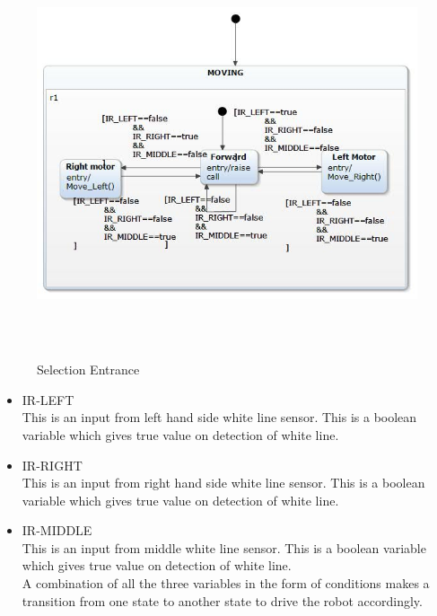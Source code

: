 \documentclass[a4paper,12pt,oneside]{article}
\begin{document}
\begin{enumerate}
\begin{figure}[H]
\centering
\includegraphics[width=13cm,height=12cm]{6.jpg}
\caption{Selection Entrance}
\end{figure}

 \begin{itemize}
 \item IR-LEFT\\
 This is an input from left hand side white line sensor. This is a boolean variable which gives true value on detection of white line.
 \item IR-RIGHT\\
  This is an input from right hand side white line sensor. This is a boolean variable which gives true value on detection of white line.
 \item IR-MIDDLE\\
  This is an input from middle white line sensor. This is a boolean variable which gives true value on detection of white line.\\
  A combination of all the three variables in the form of conditions makes a transition from one state to another state to drive the robot accordingly.
 \end{itemize}
 

\end{enumerate}
\end{document}
